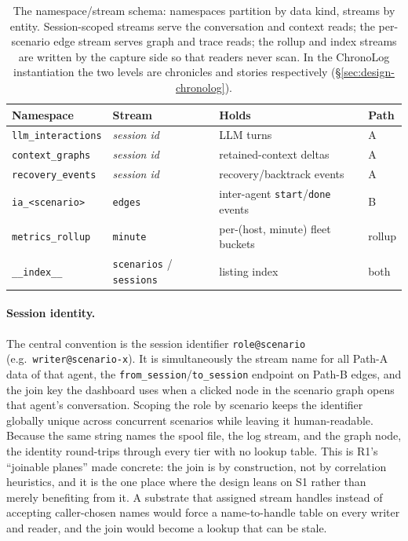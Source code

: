 \begin{table}[h]
\centering
\small
\begin{tabular}{@{}llll@{}}
\toprule
\textbf{Namespace} & \textbf{Stream} & \textbf{Holds} & \textbf{Path} \\
\midrule
\texttt{llm\_interactions} & \emph{session id} & LLM turns & A \\
\texttt{context\_graphs}   & \emph{session id} & retained-context deltas & A \\
\texttt{recovery\_events}  & \emph{session id} & recovery/backtrack events & A \\
\texttt{ia\_<scenario>}    & \texttt{edges}    & inter-agent \texttt{start}/\texttt{done} events & B \\
\texttt{metrics\_rollup}   & \texttt{minute}   & per-(host, minute) fleet buckets & rollup \\
\texttt{\_\_index\_\_}     & \texttt{scenarios} / \texttt{sessions} & listing index & both \\
\bottomrule
\end{tabular}
\caption[The namespace/stream schema]{The namespace/stream schema:
namespaces partition by data kind,
streams by entity. Session-scoped streams serve the conversation and
context reads; the per-scenario edge stream serves graph and trace reads;
the rollup and index streams are written by the capture side so that
readers never scan. In the ChronoLog instantiation the two levels are
chronicles and stories respectively (\S\ref{sec:design-chronolog}).}
\label{tab:schema}
\end{table}

\paragraph{Session identity.} The central convention is the session
identifier \texttt{role@scenario} (e.g.\ \texttt{writer@scenario-x}). It is
simultaneously the stream name for all Path-A data of that agent,
the \texttt{from\_session}/\texttt{to\_session} endpoint on Path-B edges, and
the join key the dashboard uses when a clicked node in the scenario graph
opens that agent's conversation. Scoping the role by scenario keeps the
identifier globally unique across concurrent scenarios while leaving it
human-readable. Because the same string names the spool file, the
log stream, and the graph node, the identity round-trips through every
tier with no lookup table. This is R1's ``joinable planes'' made concrete:
the join is by construction, not by correlation heuristics, and it is the
one place where the design leans on S1 rather than merely benefiting from
it. A substrate that assigned stream handles instead of accepting
caller-chosen names would force a name-to-handle table on every writer and
reader, and the join would become a lookup that can be stale.

